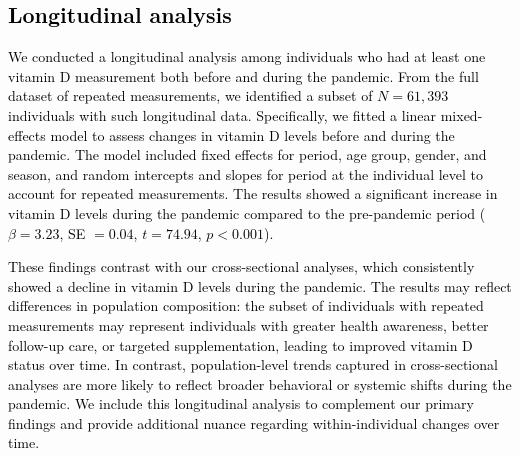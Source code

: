 \documentclass[12pt]{article}
\newcommand{\REV}[1]{\textcolor{black}{#1}}
\begin{document}
\begin{appendices}
\newpage

\section{\REV{Longitudinal analysis}}
\label{supp:longitudinal_analysis}

\REV{We conducted a longitudinal analysis among individuals who had at least one vitamin D measurement both before and during the pandemic. From the full dataset of repeated measurements, we identified a subset of $N=61{,}393$ individuals with such longitudinal data. Specifically, we fitted a linear mixed-effects model to assess changes in vitamin D levels before and during the pandemic.  The model included fixed effects for period, age group, gender, and season, and random intercepts and slopes for period at the individual level to account for repeated measurements. The results showed a significant increase in vitamin D levels during the pandemic compared to the pre-pandemic period ($\beta = 3.23$, SE $= 0.04$, $t = 74.94$, $p < 0.001$).
}

\REV{These findings contrast with our cross-sectional analyses, which consistently showed a decline in vitamin D levels during the pandemic. The results may reflect differences in population composition: the subset of individuals with repeated measurements may represent individuals with greater health awareness, better follow-up care, or targeted supplementation, leading to improved vitamin D status over time. In contrast, population-level trends captured in cross-sectional analyses are more likely to reflect broader behavioral or systemic shifts during the pandemic. We include this longitudinal analysis to complement our primary findings and provide additional nuance regarding within-individual changes over time.}




\end{appendices}
\end{document}
